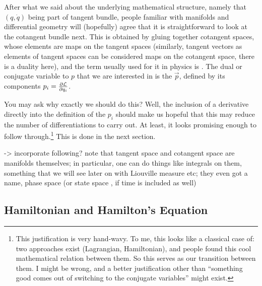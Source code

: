 \documentclass[../class_mech_main.tex]{subfiles}
\begin{document}
After what we said about the underlying mathematical structure, namely that $(q, \dot{q})$ being part of tangent bundle, people familiar with manifolds and differential geometry will (hopefully) agree that it is straightforward to look at the cotangent bundle next. This is obtained by gluing together cotangent spaces, whose elements are maps on the tangent spaces (similarly, tangent vectors as elements of tangent spaces can be considered maps on the cotangent space, there is a duality here), and the term usually used for it in physics is . The dual or conjugate variable to $p$ that we are interested in is the  $\vec{p}$, defined by its components $p_i = \pdv{\mathcal{L}}{q_i}$. 


You may ask why exactly we should do this? Well, the inclusion of a derivative directly into the definition of the $p_i$ should make us hopeful that this may reduce the number of differentiations to carry out. At least, it looks promising enough to follow through.\footnote{This justification is very hand-wavy. To me, this looks like a classical case of: two approaches exist (Lagrangian, Hamiltonian), and people found this cool mathematical relation between them. So this serves as our transition between them. I might be wrong, and a better justification other than \enquote{something good comes out of switching to the conjugate variables} might exist.} This is done in the next section.


-> incorporate following? note that tangent space and cotangent space are manifolds themselves; in particular, one can do things like integrals on them, something that we will see later on with Liouville measure etc; they even got a name, phase space (or state space , if time is included as well)



		\subsection{Hamiltonian and Hamilton's Equation}
\end{document}
